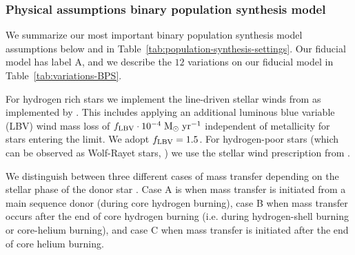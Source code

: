 \documentclass[twocolumn]{aastex63}
\newcommand\COMPAS{{\sc{COMPAS }}}
\newcommand{\Msun}{\ensuremath{\,\rm{M}_{\odot}}\xspace}
\newcommand{\Kelvin}{\ensuremath{\,\mathrm{K}}\xspace}
\newcommand{\yearmin}{\ensuremath{\,\rm{yr}^{-1}}\xspace}
\newcommand{\CMP}{C20}
\newcommand{\NmodelsBPS}{\ensuremath{12}\xspace}
\begin{document}




\subsubsection{Physical assumptions binary population synthesis model }
\label{subsec:method-BPS-physical-assumptions}
We summarize our most important binary population synthesis model assumptions below and in Table~\ref{tab:population-synthesis-settings}. Our fiducial model has label A, and we describe the \NmodelsBPS variations on our fiducial model in Table~\ref{tab:variations-BPS}.

For hydrogen rich stars 
we implement the line-driven stellar winds from  \citet{2000A&A...362..295V,2001A&A...369..574V} as implemented by \citet[][see their Eqs.~6 and 7]{2010ApJ...714.1217B}. This includes applying an additional luminous blue variable (LBV) wind mass loss of $f_{\rm{LBV}} \cdot  10^{-4}$\Msun\yearmin{}  independent of metallicity  for stars entering the \citet{1994PASP..106.1025H} limit. 
We adopt $f_{\rm{LBV}} = 1.5$. For hydrogen-poor  stars (which can be observed as Wolf-Rayet stars, \citealt{2007ARA&A..45..177C}) we use the stellar wind prescription from \citet{2010ApJ...715L.138B}.


We distinguish between three different cases of mass transfer depending on the stellar phase of the donor star \citep[based on][]{1967ZA.....65..251K,1970A&A.....7..150L}.  Case A is when mass transfer is initiated from a main sequence donor (during core hydrogen burning), case B when mass transfer occurs after the end of core hydrogen burning (i.e. during hydrogen-shell burning or core-helium burning), and case C  when mass transfer is initiated after the end of core helium burning. 
\end{document}
